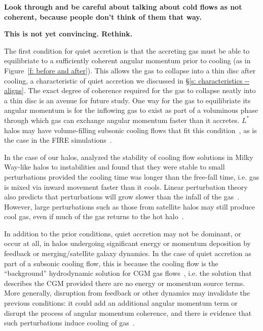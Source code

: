 \documentclass[fleqn,usenatbib]{mnras}
\begin{document}
\textbf{Look through and be careful about talking about cold flows as not coherent, because people don't think of them that way.}

\textbf{This is not yet convincing. Rethink.}

The first condition for quiet accretion is that the accreting gas must be able to equilibriate to a sufficiently coherent angular momentum prior to cooling (as in Figure~\ref{f: before and after}).
This allows the gas to collapse into a thin disc after cooling, a characteristic of quiet accretion we discussed in \S\ref{s: characteristics -- aligns}.
The exact degree of coherence required for the gas to collapse neatly into a thin disc is an avenue for future study.
One way for the gas to equilibriate its angular momentum is for the inflowing gas to exist as part of a voluminous phase through which gas can exchange angular momentum faster than it accretes.
$L^*$ halos may have volume-filling subsonic cooling flows that fit this condition~\citep{Stern2019}, as is the case in the FIRE simulations~\citep{Stern2020a}.

In the case of our halos, \cite{Stern2019} analyzed the stability of cooling flow solutions in Milky Way-like halos to instabilities and found that they were stable to small perturbations provided the cooling time was longer than the free-fall time, i.e. gas is mixed via inward movement faster than it cools.
Linear perturbation theory also predicts that perturbations will grow slower than the infall of the gas~\citep[e.g.][]{Balbus1989}.
However, large perturbations such as those from satellite halos may still produce cool gas, even if much of the gas returns to the hot halo~\citep{Esmerian2020}.

In addition to the prior conditions, quiet accretion may not be dominant, or occur at all, in halos undergoing significant energy or momentum deposition by feedback or merging/satellite galaxy dynamics.
In the case of quiet accretion as part of a subsonic cooling flow, this is because the cooling flow is the ``background'' hydrodynamic solution for CGM gas flows~\cite{Stern2019}, i.e. the solution that describes the CGM provided there are no energy or momentum source terms.
More generally, disruption from feedback or other dynamics may invalidate the previous conditions: it could add an additional angular momentum term or disrupt the process of angular momentum coherence, and there is evidence that such perturbations induce cooling of gas~\citep[e.g.][]{Hummels2019, Esmerian2020}.
\end{document}
